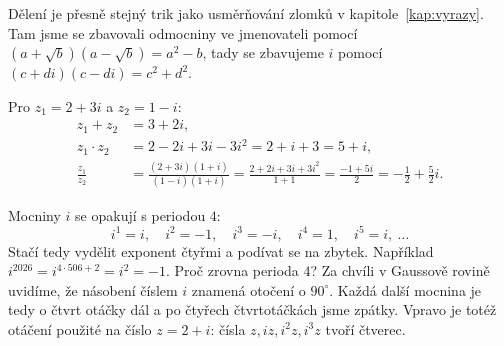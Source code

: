 Dělení je přesně stejný trik jako usměrňování zlomků v kapitole~\ref{kap:vyrazy}. Tam jsme se zbavovali odmocniny ve jmenovateli pomocí $(a + \sqrt{b})(a - \sqrt{b}) = a^2 - b$, tady se zbavujeme $i$ pomocí $(c + di)(c - di) = c^2 + d^2$.

\begin{example}
  Pro $z_1 = 2 + 3i$ a $z_2 = 1 - i$:
  \begin{align*}
    z_1 + z_2 &= 3 + 2i,\\
    z_1\cdot z_2 &= 2 - 2i + 3i - 3i^2 = 2 + i + 3 = 5 + i,\\
    \frac{z_1}{z_2} &= \frac{(2 + 3i)(1 + i)}{(1 - i)(1 + i)} = \frac{2 + 2i + 3i + 3i^2}{1 + 1} = \frac{-1 + 5i}{2} = -\frac{1}{2} + \frac{5}{2}i.
  \end{align*}
\end{example}

\begin{note}
  Mocniny $i$ se opakují s periodou $4$:
  \begin{equation*}
    i^1 = i,\quad i^2 = -1,\quad i^3 = -i,\quad i^4 = 1,\quad i^5 = i,\ \ldots
  \end{equation*}
  Stačí tedy vydělit exponent čtyřmi a podívat se na zbytek. Například $i^{2026} = i^{4\cdot 506 + 2} = i^2 = -1$.
  Proč zrovna perioda $4$? Za chvíli v Gaussově rovině uvidíme, že násobení číslem $i$ znamená otočení o $90^\circ$. Každá další mocnina je tedy o čtvrt otáčky dál a po čtyřech čtvrtotáčkách jsme zpátky. Vpravo je totéž otáčení použité na číslo $z = 2 + i$: čísla $z, iz, i^2z, i^3z$ tvoří čtverec.
  \begin{center}
  \end{center}
\end{note}

